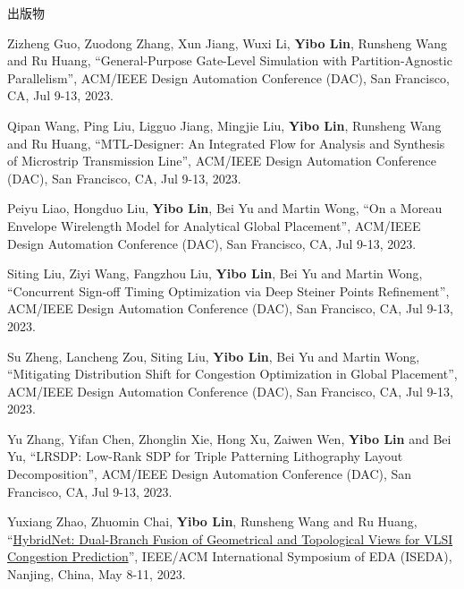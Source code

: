 \begin{rSection}{出版物}
\begin{description}[font=\normalfont, rightmargin=2em]
{}
            

\item[{[C82]}]{
        Zizheng Guo, Zuodong Zhang, Xun Jiang, Wuxi Li, \textbf{Yibo Lin}, Runsheng Wang and Ru Huang, 
    ``General-Purpose Gate-Level Simulation with Partition-Agnostic Parallelism'', 
    ACM/IEEE Design Automation Conference (DAC), San Francisco, CA, Jul 9-13, 2023.
    
}
            

\item[{[C81]}]{
        Qipan Wang, Ping Liu, Ligguo Jiang, Mingjie Liu, \textbf{Yibo Lin}, Runsheng Wang and Ru Huang, 
    ``MTL-Designer: An Integrated Flow for Analysis and Synthesis of Microstrip Transmission Line'', 
    ACM/IEEE Design Automation Conference (DAC), San Francisco, CA, Jul 9-13, 2023.
    
}
            

\item[{[C80]}]{
        Peiyu Liao, Hongduo Liu, \textbf{Yibo Lin}, Bei Yu and Martin Wong, 
    ``On a Moreau Envelope Wirelength Model for Analytical Global Placement'', 
    ACM/IEEE Design Automation Conference (DAC), San Francisco, CA, Jul 9-13, 2023.
    
}
            

\item[{[C79]}]{
        Siting Liu, Ziyi Wang, Fangzhou Liu, \textbf{Yibo Lin}, Bei Yu and Martin Wong, 
    ``Concurrent Sign-off Timing Optimization via Deep Steiner Points Refinement'', 
    ACM/IEEE Design Automation Conference (DAC), San Francisco, CA, Jul 9-13, 2023.
    
}
            

\item[{[C78]}]{
        Su Zheng, Lancheng Zou, Siting Liu, \textbf{Yibo Lin}, Bei Yu and Martin Wong, 
    ``Mitigating Distribution Shift for Congestion Optimization in Global Placement'', 
    ACM/IEEE Design Automation Conference (DAC), San Francisco, CA, Jul 9-13, 2023.
    
}
            

\item[{[C77]}]{
        Yu Zhang, Yifan Chen, Zhonglin Xie, Hong Xu, Zaiwen Wen, \textbf{Yibo Lin} and Bei Yu, 
    ``LRSDP: Low-Rank SDP for Triple Patterning Lithography Layout Decomposition'', 
    ACM/IEEE Design Automation Conference (DAC), San Francisco, CA, Jul 9-13, 2023.
    
}
            

\item[{[C76]}]{
        Yuxiang Zhao, Zhuomin Chai, \textbf{Yibo Lin}, Runsheng Wang and Ru Huang, 
    ``\href{https://arxiv.org/pdf/2305.05374.pdf}{HybridNet: Dual-Branch Fusion of Geometrical and Topological Views for VLSI Congestion Prediction}'', 
    IEEE/ACM International Symposium of EDA (ISEDA), Nanjing, China, May 8-11, 2023.
    
}
\end{description}
\end{rSection}
